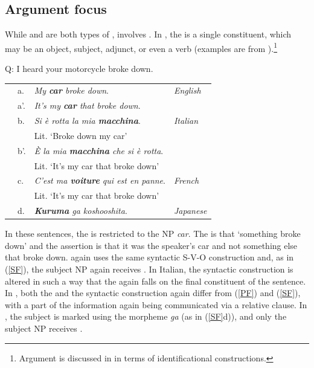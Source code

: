 \subsection{Argument focus}\label{afsection}

While  and  are both types of ,  involves . In , the  is a single constituent, which may be an object, subject, adjunct, or even a verb (examples are from \citealt{lambrecht1994}).\footnote{Argument  is discussed in  in terms of identificational constructions.}


\ea\label{AF}
{Q: I heard your motorcycle broke down.} \\
\begin{table} 
\begin{tabular}{l l l l}
 & a. & \textit{My \textbf{car} broke down}. & \textit{English} \\
 & a'. & \textit{It's my \textbf{car} that broke down}. \\
 & b. & \textit{Si \`{e} rotta la mia \textbf{macchina}}. & \textit{Italian} \\
  & & Lit. `Broke down my car' \\
   & b'. & \textit{\`{E} la mia \textbf{macchina} che si \`{e} rotta}. \\
     & & Lit. `It's my car that broke down' \\
 & c. & \textit{C'est ma \textbf{voiture} qui est en panne}. & \textit{French} \\
  & & Lit. `It's my car that broke down'  \\
   & d. & \textit{\textbf{Kuruma} ga koshooshita}.  & \textit{Japanese} \\
\end{tabular}
\end{table}
\z

In these sentences, the  is restricted to the NP \textit{car}. The  is that `something broke down' and the assertion is that it was the speaker's car and not something else that broke down.  again uses the same syntactic S-V-O construction and, as in (\ref{SF}), the subject NP again receives . In Italian, the syntactic construction is altered in such a way that the  again falls on the final constituent of the sentence. In , both the  and the syntactic construction again differ from (\ref{PF}) and (\ref{SF}), with a part of the information again being communicated via a relative clause. In , the subject is marked using the morpheme \textit{ga} (as in (\ref{SF}d)), and only the subject NP receives .

